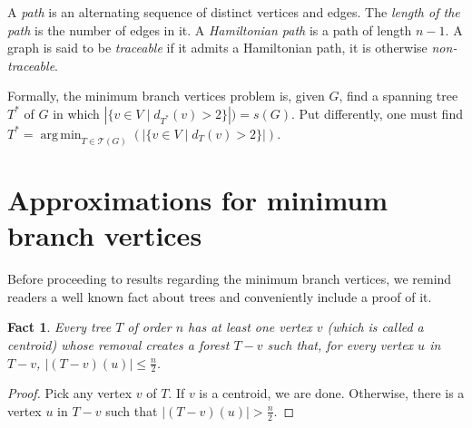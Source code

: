 \documentclass[12pt]{article}
\newtheorem{fact}[theorem]{Fact}
\DeclareMathOperator*{\argmin}{arg\,min}
\begin{document}
A \emph{path} is an alternating sequence of distinct vertices and edges.
The \emph{length of the path} is the number of edges in it.
A \emph{Hamiltonian path} is a path of length $n - 1$.
A graph is said to be \emph{traceable} if it admits a Hamiltonian path, it is otherwise \emph{non-traceable}.

Formally, the minimum branch vertices problem is, given $G$, find a spanning tree $T^*$ of $G$ in which $|\{v \in V \mid d_{T^*}(v) > 2 \}|) = s(G)$.
Put differently, one must find $T^* = \argmin_{T \in \mathcal{T}(G)}(|\{ v \in V \mid d_T(v) > 2\}|)$.

\section{Approximations for minimum branch vertices}
Before proceeding to results regarding the minimum branch vertices, we remind readers a well known fact about trees and conveniently include a proof of it.

\begin{fact}
  Every tree $T$ of order $n$ has at least one vertex $v$ (which is called a \emph{centroid}) whose removal creates a forest $T - v$ such that, for every vertex $u$ in $T - v$, $|(T - v)(u)| \le \frac{n}{2}$.
\end{fact}
\begin{proof}
  Pick any vertex $v$ of $T$.
  If $v$ is a centroid, we are done.
  Otherwise, there is a vertex $u$ in $T - v$ such that $|(T - v)(u)| > \frac{n}{2}$.
\end{proof}



\end{document}
